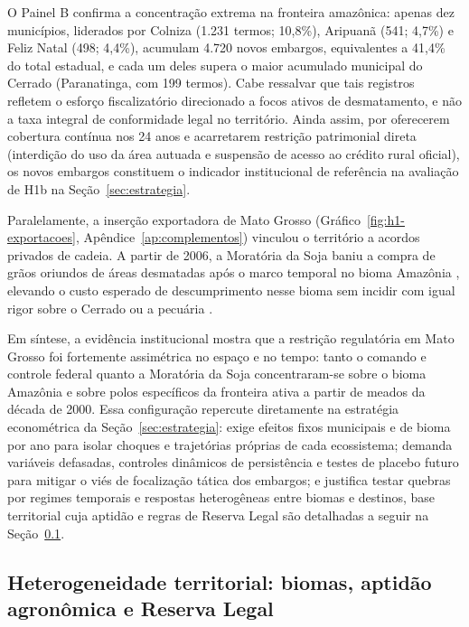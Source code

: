 O Painel B confirma a concentração extrema na fronteira amazônica: apenas dez municípios, liderados por Colniza (1.231 termos; 10,8\%), Aripuanã (541; 4,7\%) e Feliz Natal (498; 4,4\%), acumulam 4.720 novos embargos, equivalentes a 41,4\% do total estadual, e cada um deles supera o maior acumulado municipal do Cerrado (Paranatinga, com 199 termos). Cabe ressalvar que tais registros refletem o esforço fiscalizatório direcionado a focos ativos de desmatamento, e não a taxa integral de conformidade legal no território. Ainda assim, por oferecerem cobertura contínua nos 24 anos e acarretarem restrição patrimonial direta (interdição do uso da área autuada e suspensão de acesso ao crédito rural oficial), os novos embargos constituem o indicador institucional de referência na avaliação de H1b na Seção~\ref{sec:estrategia}.

Paralelamente, a inserção exportadora de Mato Grosso (Gráfico~\ref{fig:h1-exportacoes}, Apêndice~\ref{ap:complementos}) vinculou o território a acordos privados de cadeia. A partir de 2006, a Moratória da Soja baniu a compra de grãos oriundos de áreas desmatadas após o marco temporal no bioma Amazônia \cite{HeilmayrEtAl2020}, elevando o custo esperado de descumprimento nesse bioma sem incidir com igual rigor sobre o Cerrado ou a pecuária \cite{HardingEtAl2021}.

Em síntese, a evidência institucional mostra que a restrição regulatória em Mato Grosso foi fortemente assimétrica no espaço e no tempo: tanto o comando e controle federal quanto a Moratória da Soja concentraram-se sobre o bioma Amazônia e sobre polos específicos da fronteira ativa a partir de meados da década de 2000. Essa configuração repercute diretamente na estratégia econométrica da Seção~\ref{sec:estrategia}: exige efeitos fixos municipais e de bioma por ano para isolar choques e trajetórias próprias de cada ecossistema; demanda variáveis defasadas, controles dinâmicos de persistência e testes de placebo futuro para mitigar o viés de focalização tática dos embargos; e justifica testar quebras por regimes temporais e respostas heterogêneas entre biomas e destinos, base territorial cuja aptidão e regras de Reserva Legal são detalhadas a seguir na Seção~\ref{descritiva-heterogeneidade}.

\subsection{Heterogeneidade territorial: biomas, aptidão agronômica e Reserva Legal}
\label{descritiva-heterogeneidade}


